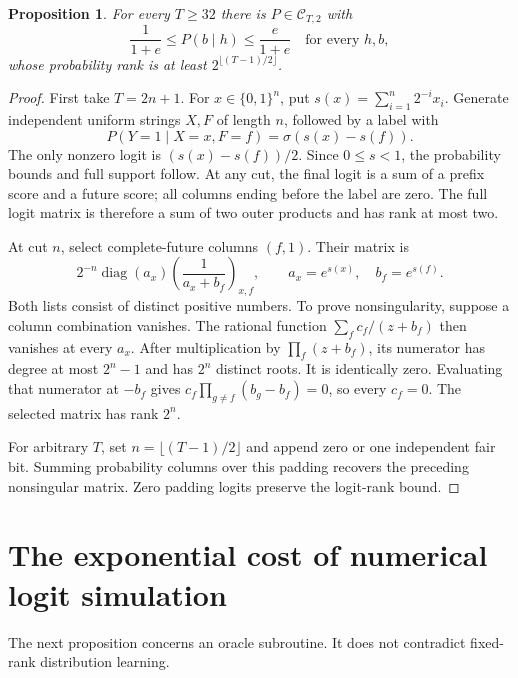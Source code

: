 \documentclass[11pt]{article}
\newtheorem{proposition}[theorem]{Proposition}
\theoremstyle{definition}
\theoremstyle{remark}
\begin{document}
\begin{proposition}\label{prop:cauchy}
For every $T\ge32$ there is $P\in\mathcal C_{T,2}$ with
\[
\frac1{1+e}\le P(b\mid h)\le\frac e{1+e}
\quad\text{for every }h,b,
\]
whose probability rank is at least $2^{\lfloor(T-1)/2\rfloor}$.
\end{proposition}
\begin{proof}
First take $T=2n+1$. For $x\in\{0,1\}^n$, put $s(x)=\sum_{i=1}^n2^{-i}x_i$. Generate independent uniform strings $X,F$ of length $n$, followed by a label with
\[
P(Y=1\mid X=x,F=f)=\sigma(s(x)-s(f)).
\]
The only nonzero logit is $(s(x)-s(f))/2$. Since $0\le s<1$, the probability bounds and full support follow. At any cut, the final logit is a sum of a prefix score and a future score; all columns ending before the label are zero. The full logit matrix is therefore a sum of two outer products and has rank at most two.

At cut $n$, select complete-future columns $(f,1)$. Their matrix is
\[
2^{-n}\operatorname{diag}(a_x)
\left(\frac1{a_x+b_f}\right)_{x,f},
\qquad a_x=e^{s(x)},\quad b_f=e^{s(f)}.
\]
Both lists consist of distinct positive numbers. To prove nonsingularity, suppose a column combination vanishes. The rational function $\sum_f c_f/(z+b_f)$ then vanishes at every $a_x$. After multiplication by $\prod_f(z+b_f)$, its numerator has degree at most $2^n-1$ and has $2^n$ distinct roots. It is identically zero. Evaluating that numerator at $-b_f$ gives $c_f\prod_{g\ne f}(b_g-b_f)=0$, so every $c_f=0$. The selected matrix has rank $2^n$.

For arbitrary $T$, set $n=\lfloor(T-1)/2\rfloor$ and append zero or one independent fair bit. Summing probability columns over this padding recovers the preceding nonsingular matrix. Zero padding logits preserve the logit-rank bound.
\end{proof}

\section{The exponential cost of numerical logit simulation}\label{sec:scalar}

The next proposition concerns an oracle subroutine. It does not contradict fixed-rank distribution learning.
\end{document}
